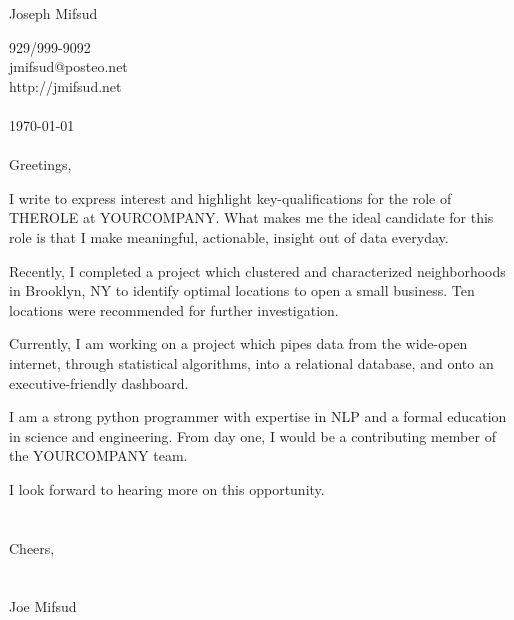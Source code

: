 \documentclass{letter}
\begin{document}
\begin{huge}
\noindent Joseph Mifsud\\
\end{huge}
\begin{large}
929/999-9092\\
jmifsud@posteo.net\\
http://jmifsud.net\\
\\
\today
\\
\\
Greetings,

I write to express interest and highlight key-qualifications for the role of THEROLE at YOURCOMPANY. What makes me the ideal candidate for this role is that I make meaningful, actionable, insight out of data everyday.

Recently, I completed a project which clustered and characterized neighborhoods in Brooklyn, NY to identify optimal locations to open a small business. Ten locations were recommended for further investigation.

Currently, I am working on a project which pipes data from the wide-open internet, through statistical algorithms, into a relational database, and onto an executive-friendly dashboard.

I am a strong python programmer with expertise in NLP and a formal education in science and engineering. From day one, I would be a contributing member of the YOURCOMPANY team.

I look forward to hearing more on this opportunity.\\
\\
\\
Cheers,\\
\\
\\
Joe Mifsud
\end{large}
\end{document}

